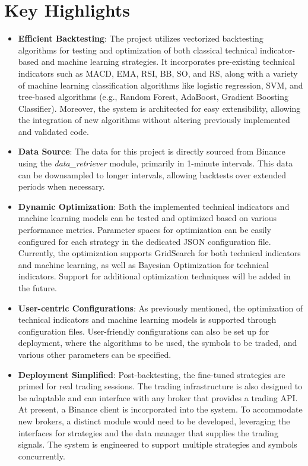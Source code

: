 \section{Key Highlights}

\begin{itemize}
    \item \textbf{Efficient Backtesting}: The project utilizes vectorized backtesting algorithms for testing and optimization of both classical technical indicator-based and machine learning strategies. It incorporates pre-existing technical indicators such as MACD, EMA, RSI, BB, SO, and RS, along with a variety of machine learning classification algorithms like logistic regression, SVM, and tree-based algorithms (e.g., Random Forest, AdaBoost, Gradient Boosting Classifier). Moreover, the system is architected for easy extensibility, allowing the integration of new algorithms without altering previously implemented and validated code. \newpage

    \item \textbf{Data Source}: The data for this project is directly sourced from Binance using the \textit{data\_retriever} module, primarily in 1-minute intervals. This data can be downsampled to longer intervals, allowing backtests over extended periods when necessary.

    \item \textbf{Dynamic Optimization}: Both the implemented technical indicators and machine learning models can be tested and optimized based on various performance metrics. Parameter spaces for optimization can be easily configured for each strategy in the dedicated JSON configuration file. Currently, the optimization supports GridSearch for both technical indicators and machine learning, as well as Bayesian Optimization for technical indicators. Support for additional optimization techniques will be added in the future.

    \item \textbf{User-centric Configurations}: As previously mentioned, the optimization of technical indicators and machine learning models is supported through configuration files. User-friendly configurations can also be set up for deployment, where the algorithms to be used, the symbols to be traded, and various other parameters can be specified.

    \item \textbf{Deployment Simplified}: Post-backtesting, the fine-tuned strategies are primed for real trading sessions. The trading infrastructure is also designed to be adaptable and can interface with any broker that provides a trading API. At present, a Binance client is incorporated into the system. To accommodate new brokers, a distinct module would need to be developed, leveraging the interfaces for strategies and the data manager that supplies the trading signals. The system is engineered to support multiple strategies and symbols concurrently.


\end{itemize}
